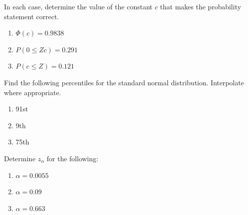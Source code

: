 \documentclass[11pt,letterpaper,boxed]{hmcpset}
\begin{document}
{%

\begin{problem}[4.3.29]
	In each case, determine the value of the constant $c$ that makes the probability statement correct.
	\begin{enumerate}
		\item
			$\Phi(c) = 0.9838$
		\item
			$P(0 \leq Z c) = 0.291$
		\item
			$P(c \leq Z) = 0.121$
	\end{enumerate}
\end{problem}

\begin{solution}
	\vfill
\end{solution}
\newpage


\begin{problem}[4.3.30]
	Find the following percentiles for the standard normal distribution.  Interpolate where appropriate.
	\begin{enumerate}
		\item
			91st
		\item
			9th
		\item
			75th
	\end{enumerate}
\end{problem}

\begin{solution}
	\vfill
\end{solution}
\newpage


\begin{problem}[4.3.31]
	Determine $z_\alpha$ for the following:
	\begin{enumerate}
		\item
			$\alpha = 0.0055$
		\item
			$\alpha = 0.09$
		\item
			$\alpha = 0.663$
	\end{enumerate}
\end{problem}

\begin{solution}
	\vfill
\end{solution}
\newpage


}
\end{document}
